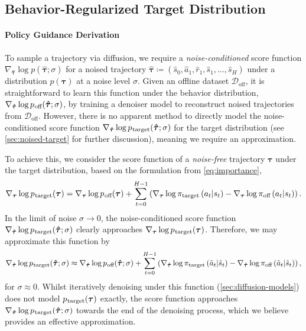 \documentclass[10pt]{article} %
\theoremstyle{plain}
\theoremstyle{definition}
\theoremstyle{remark}
\newcommand{\ptarg}{p_{\mkern1mu\text{target}}}
\newcommand{\poff}{p_{\mkern1mu\text{off}}}
\newcommand{\doff}{\mathcal{D}_{\text{off}}}
\begin{document}
\subsection{\label{sec:equi-policy}Behavior-Regularized Target Distribution}

\paragraph{Policy Guidance Derivation}
To sample a trajectory via diffusion, we require a \textit{noise-conditioned} score function $\nabla_{\bm{\hat{\tau}}} \log p(\bm{\hat{\tau}};\sigma)$ for a noised trajectory $\bm{\hat{\tau}} \coloneqq (\hat{s}_0, \hat{a}_1, \hat{r}_1, \hat{s}_1,\ldots, \hat{s}_H)$ under a distribution $p(\bm{\tau})$ at a noise level $\sigma$.
Given an offline dataset $\doff$, it is straightforward to learn this function under the behavior distribution, $\nabla_{\bm{\hat{\tau}}} \log \poff(\bm{\hat{\tau}};\sigma)$, by training a denoiser model to reconstruct noised trajectories from $\doff$.
However, there is no apparent method to directly model the noise-conditioned score function $\nabla_{\bm{\hat{\tau}}} \log \ptarg(\bm{\hat{\tau}};\sigma)$ for the target distribution (see \autoref{sec:noised-target} for further discussion), meaning we require an approximation.


To achieve this, we consider the score function of a \textit{noise-free} trajectory $\bm{\tau}$ under the target distribution, based on the formulation from \autoref{eq:importance},
\begin{equation}
    \nabla_{\bm{\tau}} \log \ptarg(\bm{\tau}) = \nabla_{\bm{\tau}}\log \poff(\bm{\tau}) + \sum_{t=0}^{H-1} \left(\nabla_{\bm{\tau}}\log \pi_{\text{target}}\left(a_t|s_t\right) - \nabla_{\bm{\tau}}\log \pi_{\text{off}}\left(a_t|s_t\right) \right)\text{.} \label{eq:target-denoise-score}
\end{equation}
In the limit of noise $\sigma \to 0$, the noise-conditioned score function $\nabla_{\bm{\hat{\tau}}} \log \ptarg(\bm{\hat{\tau}};\sigma)$ clearly approaches $\nabla_{\bm{\tau}} \log \ptarg(\bm{\tau})$. Therefore, we may approximate this function by
\begin{equation}
    \nabla_{\bm{\hat{\tau}}} \log \ptarg(\bm{\hat{\tau}};\sigma) \approx
    \nabla_{\bm{\hat{\tau}}}\log \poff(\bm{\hat{\tau}};\sigma) + \sum_{t=0}^{H-1} \left(\nabla_{\bm{\hat{\tau}}}\log \pi_{\text{target}}\left(\hat{a}_t|\hat{s}_t\right) - \nabla_{\bm{\hat{\tau}}}\log \pi_{\text{off}}\left(\hat{a}_t|\hat{s}_t\right) \right)\text{,} \label{eq:target-score}
\end{equation}
for $\sigma \approx 0$. Whilst iteratively denoising under this function (\autoref{sec:diffusion-models}) does not model $\ptarg(\bm{\tau})$ exactly, the score function approaches $\nabla_{\bm{\hat{\tau}}} \log \ptarg(\bm{\hat{\tau}};\sigma)$ towards the end of the denoising process, which we believe provides an effective approximation.
\end{document}
